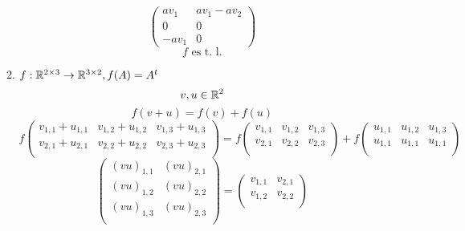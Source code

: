 \documentclass[../practica.root.tex]{subfiles}
\begin{document}
\begin{enumerate}
\begin{enumerate}
\[\begin{pmatrix}
                            av_1  & av_1 - av_2 \\
                            0     & 0           \\
                            -av_1 & 0
                        \end{pmatrix}
                    \]
                    \[ \boxed{f \text{ es t. l.}} \]
              \item $ f: \mathbb{R}^{2\times3} \to \mathbb{R}^{3\times2}, f(A) = A^t $
                    \[ v, u \in \mathbb{R}^2 \]
                    \[ f(v + u) = f(v) + f(u) \]
                    \[
                        f
                        \begin{pmatrix}
                            v_{1,1} + u_{1,1} & v_{1,2} + u_{1,2} & v_{1,3} + u_{1,3} \\
                            v_{2,1} + u_{2,1} & v_{2,2} + u_{2,2} & v_{2,3} + u_{2,3} \\
                        \end{pmatrix}
                        =
                        f
                        \begin{pmatrix}
                            v_{1,1} & v_{1,2} & v_{1,3} \\
                            v_{2,1} & v_{2,2} & v_{2,3} \\
                        \end{pmatrix}
                        +
                        f
                        \begin{pmatrix}
                            u_{1,1} & u_{1,2} & u_{1,3} \\
                            u_{1,1} & u_{1,1} & u_{1,1} \\
                        \end{pmatrix}
                    \] \[
                        \begin{pmatrix}
                            (vu)_{1,1} & (vu)_{2,1} \\
                            (vu)_{1,2} & (vu)_{2,2} \\
                            (vu)_{1,3} & (vu)_{2,3} \\
                        \end{pmatrix}
                        =
                        \begin{pmatrix}
                            v_{1,1} & v_{2,1} \\
                            v_{1,2} & v_{2,2} \\

\end{pmatrix}\]
\end{enumerate}
\end{enumerate}
\end{document}
